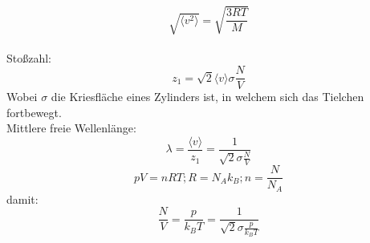 \documentclass[a4paper, fleqn]{article}
\begin{document}
\begin{equation*}
    \sqrt{\langle v^2 \rangle} = \sqrt{\frac{3RT}{M}}
\end{equation*}
\\
Stoßzahl:
\begin{equation*}
    z_1=\sqrt{2}\langle v\rangle \sigma \frac{N}{V}
\end{equation*}
Wobei $\sigma$ die Kriesfläche eines Zylinders ist, in welchem sich das Tielchen fortbewegt.\\
Mittlere freie Wellenlänge: 
\begin{equation*}
    \lambda = \frac{\langle v \rangle}{z_1}=\frac{1}{\sqrt{2}\sigma\frac{N}{V}}
\end{equation*}
\begin{equation*}
    pV = nRT; R = N_Ak_B; n=\frac{N}{N_A}
\end{equation*}
damit:
\begin{equation*}
    \frac{N}{V}=\frac{p}{k_BT}=\frac{1}{\sqrt{2}\sigma\frac{p}{k_BT}}
\end{equation*}
\end{document}
